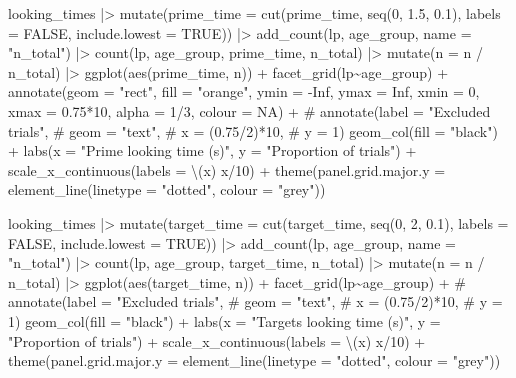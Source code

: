 \documentclass[
  letterpaper,
  DIV=11,
  numbers=noendperiod]{scrartcl}
\newenvironment{Shaded}{\begin{snugshade}}{\end{snugshade}}
\newcommand{\NormalTok}[1]{\textcolor[rgb]{0.00,0.23,0.31}{#1}}
\begin{document}
\begin{Shaded}
\begin{Highlighting}[]
\NormalTok{looking\_times |\textgreater{} }
\NormalTok{    mutate(prime\_time = cut(prime\_time, }
\NormalTok{                            seq(0, 1.5, 0.1),}
\NormalTok{                            labels = FALSE,}
\NormalTok{                            include.lowest = TRUE)) |\textgreater{} }
\NormalTok{    add\_count(lp, age\_group, name = "n\_total") |\textgreater{} }
\NormalTok{    count(lp, age\_group, prime\_time, n\_total) |\textgreater{} }
\NormalTok{    mutate(n = n / n\_total) |\textgreater{} }
\NormalTok{    ggplot(aes(prime\_time, n)) +}
\NormalTok{    facet\_grid(lp\textasciitilde{}age\_group) +}
\NormalTok{    annotate(geom = "rect",}
\NormalTok{             fill = "orange",}
\NormalTok{             ymin = {-}Inf,}
\NormalTok{             ymax = Inf,}
\NormalTok{             xmin = 0,}
\NormalTok{             xmax = 0.75*10,}
\NormalTok{             alpha = 1/3,}
\NormalTok{             colour = NA) +}
\NormalTok{    \# annotate(label = "Excluded trials",}
\NormalTok{    \#        geom = "text",}
\NormalTok{    \#         x = (0.75/2)*10,}
\NormalTok{    \#         y = 1)}
\NormalTok{    geom\_col(fill = "black") +}
\NormalTok{    labs(x = "Prime looking time (s)",}
\NormalTok{         y = "Proportion of trials") +}
\NormalTok{    scale\_x\_continuous(labels = \textbackslash{}(x) x/10) +}
\NormalTok{    theme(panel.grid.major.y = element\_line(linetype = "dotted",}
\NormalTok{                                            colour = "grey"))}
\end{Highlighting}
\end{Shaded}

\begin{Shaded}
\begin{Highlighting}[]
\NormalTok{looking\_times |\textgreater{} }
\NormalTok{    mutate(target\_time = cut(target\_time, }
\NormalTok{                            seq(0, 2, 0.1),}
\NormalTok{                            labels = FALSE,}
\NormalTok{                            include.lowest = TRUE)) |\textgreater{} }
\NormalTok{    add\_count(lp, age\_group, name = "n\_total") |\textgreater{} }
\NormalTok{    count(lp, age\_group, target\_time, n\_total) |\textgreater{} }
\NormalTok{    mutate(n = n / n\_total) |\textgreater{} }
\NormalTok{    ggplot(aes(target\_time, n)) +}
\NormalTok{    facet\_grid(lp\textasciitilde{}age\_group) +}
\NormalTok{    \# annotate(label = "Excluded trials",}
\NormalTok{    \#        geom = "text",}
\NormalTok{    \#         x = (0.75/2)*10,}
\NormalTok{    \#         y = 1)}
\NormalTok{    geom\_col(fill = "black") +}
\NormalTok{    labs(x = "Targets looking time (s)",}
\NormalTok{         y = "Proportion of trials") +}
\NormalTok{    scale\_x\_continuous(labels = \textbackslash{}(x) x/10) +}
\NormalTok{    theme(panel.grid.major.y = element\_line(linetype = "dotted",}
\NormalTok{                                            colour = "grey"))}
\end{Highlighting}
\end{Shaded}
\end{document}
